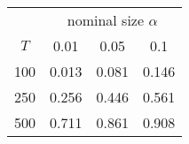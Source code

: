 % 
\begin{tabular}{cccc}
  \hline
  & \multicolumn{3}{c}{nominal size $\alpha$} \\
 $T$ & 0.01 & 0.05 & 0.1 \\
 \hline
100 & 0.013 & 0.081 & 0.146 \\ 
  250 & 0.256 & 0.446 & 0.561 \\ 
  500 & 0.711 & 0.861 & 0.908 \\ 
   \hline
\end{tabular}
